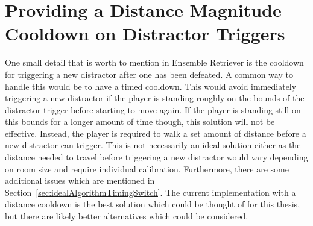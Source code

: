 \section{Providing a Distance Magnitude Cooldown on Distractor Triggers}
One small detail that is worth to mention in Ensemble Retriever is the cooldown for triggering a new distractor after one has been defeated. A common way to handle this would be to have a timed cooldown. This would avoid immediately triggering a new distractor if the player is standing roughly on the bounds of the distractor trigger before starting to move again. If the player is standing still on this bounds for a longer amount of time though, this solution will not be effective. Instead, the player is required to walk a set amount of distance before a new distractor can trigger. This is not necessarily an ideal solution either as the distance needed to travel before triggering a new distractor would vary depending on room size and require individual calibration. Furthermore, there are some additional issues which are mentioned in Section~\ref{sec:idealAlgorithmTimingSwitch}. The current implementation with a distance cooldown is the best solution which could be thought of for this thesis, but there are likely better alternatives which could be considered. 